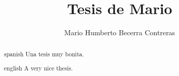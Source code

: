 \documentclass{docITAM}
\title{Tesis de Mario}
\author{Mario Humberto Becerra Contreras}
\begin{document}
	\npthousandsep{,}
	\maketitle
	\publicationrights


	
	


	\begin{abstract}{spanish}
		Una tesis muy bonita.
	\end{abstract}

	\begin{abstract}{english}
		A very nice thesis.
	\end{abstract}

	\setcounter{page}{1}

	\tableofcontents
	\listoffigures
	\listoftables
	\newpage

	\setcounter{page}{1}


	


	

	

	




	\appendix

	\clearpage



\begingroup
\raggedright
\sloppy
\printbibliography
\endgroup

\end{document}

